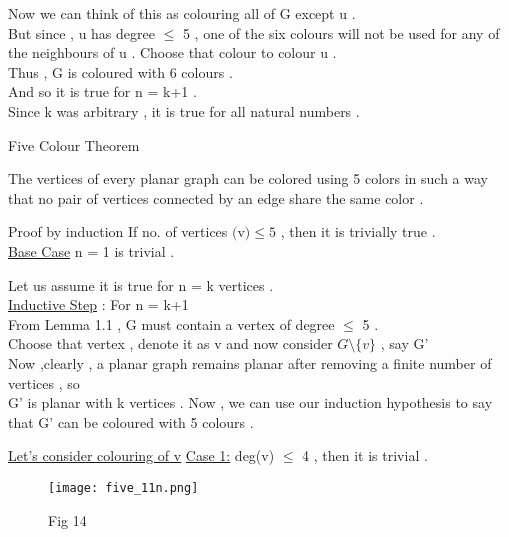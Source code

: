 \documentclass[12pt]{beamer}
\begin{document}
\begin{frame}
Now we can think of this as colouring all of G except u . \\
But since , u has degree $\leq$ 5 , one of the six colours will not be used for any of the neighbours of u . 
Choose that colour to colour u . \\
Thus , G is coloured with 6 colours . \\
And so it is true for n = k+1 .\\
Since k was arbitrary , it is true for all natural numbers . 
\end{frame}

\begin{frame}{Five Colour Theorem}
\begin{large}
The vertices of every planar graph can be colored using 5 colors
in such a way that no pair of vertices connected by an edge share the same color . 
\end{large}
\end{frame}

\begin{frame}{Proof by induction}
If no. of vertices $($v$) \leq 5$ , then it is trivially true . \\
\underline {\large{Base Case}} n = 1 is trivial .

Let us assume it is true for n = k vertices .\\
\underline {\large{Inductive Step}} : For n = k+1 \\
From Lemma 1.1 , G must contain a vertex of degree $\leq$ 5 . \\
Choose that vertex , denote it as v and now consider $G \setminus \{v\}$ , say G'\\

Now ,clearly , a planar graph remains planar after removing a finite number of vertices , so \\
 G' is planar with k vertices . Now , we can use our induction hypothesis to say that G' can be coloured with 5 colours .\\
\end{frame}


\begin{frame}
\underline{Let's consider colouring of v} \newline \newline
\underline{\large{Case 1:}} deg(v) $\leq$ 4 , then it is trivial .\\
\begin{figure}
\texttt{[image: five\_11n.png]}
\caption{Fig 14}
\end{figure}
\end{frame}
\end{document}
